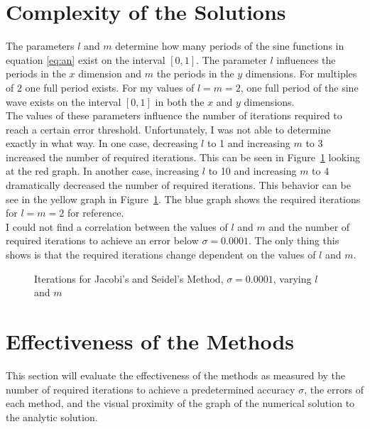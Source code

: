 \documentclass[a4paper,12pt,reqno]{article}
\newcommand{\figref}[1]{Figure~\ref{#1}}
\begin{document}
\section{Complexity of the Solutions}

The parameters $l$ and $m$ determine how many periods of the sine functions in 
equation \eqref{eq:an} exist on the interval $[0,1]$. The parameter $l$
influences the periods in the $x$ dimension and $m$ the periods in the $y$
dimensions. For multiples of 2 one full period exists. For my values of 
$l=m=2$, one
full period of the sine wave exists on the interval $[0,1]$ in both the $x$ and
$y$ dimensions.\\
The values of these parameters influence the number of iterations required to 
reach a certain error threshold. Unfortunately, I was not able to determine
exactly in what way. In one case, decreasing $l$ to 1 and increasing $m$ to
3 increased the number of required iterations. This can be seen in
\figref{fig:complex} looking at the red graph.
In another case, increasing $l$ to 10 and increasing $m$ to 4 dramatically
decreased the number of required iterations. This behavior can be see in the
yellow graph in \figref{fig:complex}. The blue graph shows the required
iterations for $l = m = 2$ for reference.\\
I could not find a correlation between the values of $l$ and $m$ and the number
of required iterations to achieve an error below $\sigma=0.0001$. The only 
thing this shows is that the required iterations change dependent on the 
values of $l$ and $m$.
\begin{figure}[H]
    \center
    \hspace{3pt}
    \caption{Iterations for Jacobi's and Seidel's Method, $\sigma=0.0001$,
    varying $l$ and $m$}
    \label{fig:complex}
\end{figure}

\section{Effectiveness of the Methods}

This section will evaluate the effectiveness of the methods as measured by the 
number of required iterations to achieve a predetermined accuracy $\sigma$, the 
errors of each method, and the visual proximity of the graph of the numerical 
solution to the analytic solution.
\end{document}
